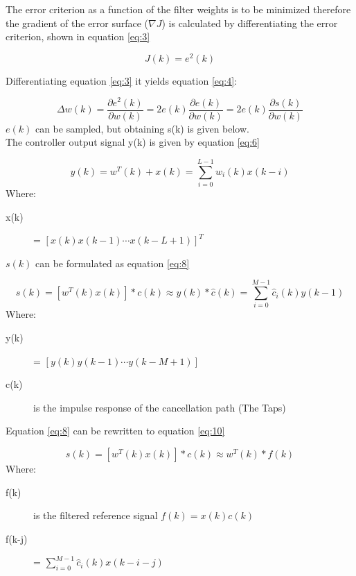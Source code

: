 The error criterion as a function of the filter weights is to be minimized therefore the gradient of the error surface ($\nabla J$) is calculated by differentiating the error criterion, shown in equation \ref{eq:3} 

\begin{equation}\label{eq:3}
J(k) = e^2(k)
\end{equation}

Differentiating equation \ref{eq:3} it yields equation \ref{eq:4}:

\begin{equation}\label{eq:4}
\Delta w(k) = \frac{\partial e^2(k)}{\partial w(k)} = 2e(k)\frac{\partial e(k)}{\partial w(k)} = 2e(k)\frac{\partial s(k)}{\partial w(k)}
\end{equation}
$e(k)$ can be sampled, but obtaining s(k) is given below. \\
The controller output signal y(k) is given by equation \ref{eq:6} 

\begin{equation}\label{eq:6}
y(k) = w^T(k) + x(k) = \sum_{i=0}^{L-1} w_i(k)x(k-i)
\end{equation}
Where:
\begin{description}
	\item[x(k)] = $[x(k) x(k-1) \cdots x(k-L+1)]^T $
\end{description}
$s(k)$ can be formulated as equation \ref{eq:8}

\begin{equation}\label{eq:8}
s(k) = [w^T(k)x(k)]*c(k)\approx y(k)*\hat{c}(k) = \sum_{i=0}^{M-1}\hat{c}_i(k)y(k-1)
\end{equation}
Where:
\begin{description}
	\item[y(k)] = $[ y(k) y(k-1) \cdots y(k-M+1)]$
	\item[c(k)] is the impulse response of the cancellation path (The Taps)
\end{description}

Equation \ref{eq:8} can be rewritten to equation \ref{eq:10}

\begin{equation}\label{eq:10}
s(k) = [w^T(k)x(k)]*c(k)\approx w^T(k)*f(k)
\end{equation}
Where:
\begin{description}
	\item[f(k)] is the filtered reference signal $f(k)=x(k)c(k)$
	\item[f(k-j)] = $\sum_{i=0}^{M-1}\hat{c}_i(k)x(k-i-j)$
\end{description}

